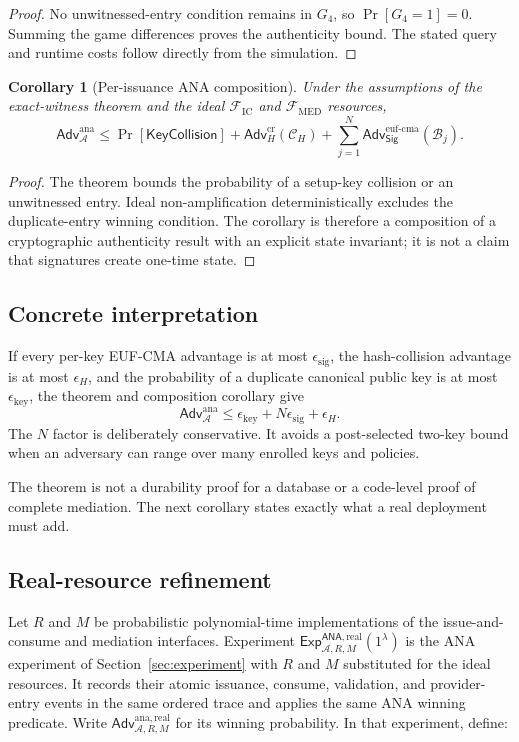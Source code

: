 \documentclass[10pt]{article}
\newtheorem{corollary}{Corollary}
\newcommand{\Adv}{\mathsf{Adv}}
\newcommand{\ANA}{\mathsf{ANA}}
\begin{document}
\begin{proof}
No unwitnessed-entry condition remains in $G_4$, so $\Pr[G_4=1]=0$. Summing
the game differences proves the authenticity bound. The stated query and
runtime costs follow directly from the simulation.
\end{proof}

\begin{corollary}[Per-issuance ANA composition]
Under the assumptions of the exact-witness theorem and the ideal
$\mathcal F_{\mathrm{IC}}$ and $\mathcal F_{\mathrm{MED}}$ resources,
\[
 \Adv^{\mathrm{ana}}_{\mathcal A}
 \leq
 \Pr[\mathsf{KeyCollision}]
 +\Adv^{\mathrm{cr}}_H(\mathcal C_H)
 +\sum_{j=1}^{N}
   \Adv^{\mathrm{euf\mbox{-}cma}}_{\mathsf{Sig}}(\mathcal B_j).
\]
\end{corollary}

\begin{proof}
The theorem bounds the probability of a setup-key collision or an unwitnessed
entry. Ideal non-amplification deterministically excludes the duplicate-entry
winning condition.
The corollary is therefore a composition of a cryptographic authenticity result
with an explicit state invariant; it is not a claim that signatures create
one-time state.
\end{proof}

\subsection{Concrete interpretation}

If every per-key EUF-CMA advantage is at most $\epsilon_{\mathrm{sig}}$, the
hash-collision advantage is at most $\epsilon_H$, and the probability of a
duplicate canonical public key is at most $\epsilon_{\mathrm{key}}$, the theorem
and composition corollary give
\[
 \Adv^{\mathrm{ana}}_{\mathcal A}
 \leq \epsilon_{\mathrm{key}}+N\epsilon_{\mathrm{sig}}+\epsilon_H.
\]
The $N$ factor is deliberately conservative. It avoids a post-selected two-key
bound when an adversary can range over many enrolled keys and policies.

The theorem is not a durability proof for a database or a code-level proof of
complete mediation. The next corollary states exactly what a real deployment
must add.

\subsection{Real-resource refinement}

Let $R$ and $M$ be probabilistic polynomial-time implementations of the
issue-and-consume and mediation interfaces. Experiment
$\mathsf{Exp}^{\ANA,\mathrm{real}}_{\mathcal A,R,M}(1^\lambda)$ is the ANA
experiment of Section~\ref{sec:experiment} with $R$ and $M$ substituted for the
ideal resources. It records their atomic issuance, consume, validation, and provider-entry
events in the same ordered trace and applies the same ANA winning predicate.
Write $\Adv^{\mathrm{ana,real}}_{\mathcal A,R,M}$ for its winning probability.
In that experiment, define:
\end{document}

